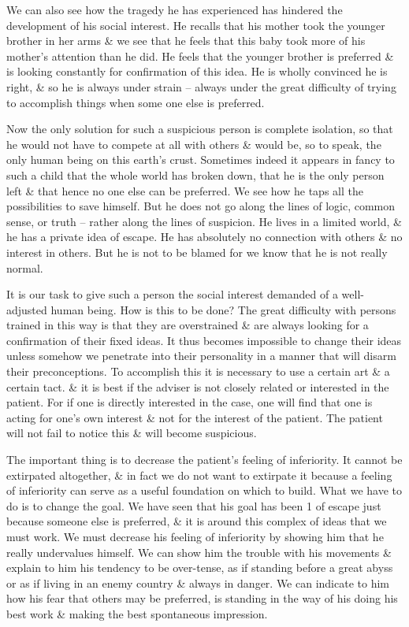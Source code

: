 \documentclass{article}
\numberwithin{equation}{section}
\begin{document}
We can also see how the tragedy he has experienced has hindered the development of his social interest. He recalls that his mother took the younger brother in her arms \& we see that he feels that this baby took more of his mother's attention than he did. He feels that the younger brother is preferred \& is looking constantly for confirmation of this idea. He is wholly convinced he is right, \& so he is always under strain -- always under the great difficulty of trying to accomplish things when some one else is preferred.

Now the only solution for such a suspicious person is complete isolation, so that he would not have to compete at all with others \& would be, so to speak, the only human being on this earth's crust. Sometimes indeed it appears in fancy to such a child that the whole world has broken down, that he is the only person left \& that hence no one else can be preferred. We see how he taps all the possibilities to save himself. But he does not go along the lines of logic, common sense, or truth -- rather along the lines of suspicion. He lives in a limited world, \& he has a private idea of escape. He has absolutely no connection with others \& no interest in others. But he is not to be blamed for we know that he is not really normal.

It is our task to give such a person the social interest demanded of a well-adjusted human being. How is this to be done? The great difficulty with persons trained in this way is that they are overstrained \& are always looking for a confirmation of their fixed ideas. It thus becomes impossible to change their ideas unless somehow we penetrate into their personality in a manner that will disarm their preconceptions. To accomplish this it is necessary to use a certain art \& a certain tact. \& it is best if the adviser is not closely related or interested in the patient. For if one is directly interested in the case, one will find that one is acting for one's own interest \& not for the interest of the patient. The patient will not fail to notice this \& will become suspicious.

The important thing is to decrease the patient's feeling of inferiority. It cannot be extirpated altogether, \& in fact we do not want to extirpate it because a feeling of inferiority can serve as a useful foundation on which to build. What we have to do is to change the goal. We have seen that his goal has been 1 of escape just because someone else is preferred, \& it is around this complex of ideas that we must work. We must decrease his feeling of inferiority by showing him that he really undervalues himself. We can show him the trouble with his movements \& explain to him his tendency to be over-tense, as if standing before a great abyss or as if living in an enemy country \& always in danger. We can indicate to him how his fear that others may be preferred, is standing in the way of his doing his best work \& making the best spontaneous impression.
\end{document}
